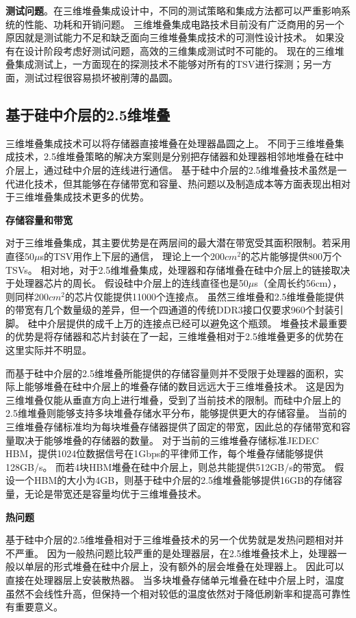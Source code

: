 \textbf{测试问题}。在三维堆叠集成设计中，不同的测试策略和集成方法都可以严重影响系统的性能、功耗和开销问题。
三维堆叠集成电路技术目前没有广泛商用的另一个原因就是测试能力不足和缺乏面向三维堆叠集成技术的可测性设计技术。
如果没有在设计阶段考虑好测试问题，高效的三维集成测试时不可能的。
现在的三维堆叠集成测试上，一方面现在的探测技术不能够对所有的TSV进行探测；另一方面，测试过程很容易损坏被削薄的晶圆。



\subsection{基于硅中介层的2.5维堆叠}

三维堆叠集成技术可以将存储器直接堆叠在处理器晶圆之上。
不同于三维堆叠集成技术，2.5维堆叠策略的解决方案则是分别把存储器和处理器相邻地堆叠在硅中介层上，通过硅中介层的连线进行通信。
基于硅中介层的2.5维堆叠技术虽然是一代进化技术，但其能够在存储带宽和容量、热问题以及制造成本等方面表现出相对于三维堆叠集成技术更多的优势。

\textbf{存储容量和带宽}

对于三维堆叠集成，其主要优势是在两层间的最大潜在带宽受其面积限制。若采用直径50$\mu$s的TSV用作上下层的通信，
理论上一个200$cm^{2}$的芯片能够提供800万个TSVs。
相对地，对于2.5维堆叠集成，处理器和存储堆叠在硅中介层上的链接取决于处理器芯片的周长。
假设硅中介层上的连线直径也是50$\mu$s（全周长约56cm），则同样200$cm^{2}$的芯片仅能提供11000个连接点。
虽然三维堆叠和2.5维堆叠能提供的带宽有几个数量级的差异，但一个四通道的传统DDR3接口仅要求960个封装引脚。
硅中介层提供的成千上万的连接点已经可以避免这个瓶颈。
堆叠技术最重要的优势是将存储器和芯片封装在了一起，三维堆叠相对于2.5维堆叠更多的优势在这里实际并不明显。

而基于硅中介层的2.5维堆叠所能提供的存储容量则并不受限于处理器的面积，实际上能够堆叠在硅中介层上的堆叠存储的数目远远大于三维堆叠技术。
这是因为三维堆叠仅能从垂直方向上进行堆叠，受到了当前技术的限制。而硅中介层上的2.5维堆叠则能够支持多块堆叠存储水平分布，能够提供更大的存储容量。
当前的三维堆叠存储标准均为每块堆叠存储器提供了固定的带宽，因此总的存储带宽和容量取决于能够堆叠的存储器的数量。
对于当前的三维堆叠存储标准JEDEC HBM，提供1024位数据信号在1Gbps的平律师工作，每个堆叠存储能够提供128GB/s。 
而若4块HBM堆叠在硅中介层上，则总共能提供512GB/s的带宽。
假设一个HBM的大小为4GB，则基于硅中介层的2.5维堆叠能够提供16GB的存储容量，无论是带宽还是容量均优于三维堆叠技术。

\textbf{热问题}

基于硅中介层的2.5维堆叠相对于三维堆叠技术的另一个优势就是发热问题相对并不严重。
因为一般热问题比较严重的是处理器层，在2.5维堆叠技术上，处理器一般以单层的形式堆叠在硅中介层上，没有额外的层会堆叠在处理器上。
因此可以直接在处理器层上安装散热器。
当多块堆叠存储单元堆叠在硅中介层上时，温度虽然不会线性升高，但保持一个相对较低的温度依然对于降低刷新率和提高可靠性有重要意义。

